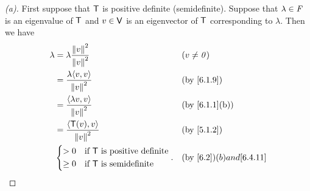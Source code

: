 \begin{proof}[(a)]
	First suppose that \(\mathsf{T}\) is positive definite (semidefinite).
	Suppose that \(\lambda \in \mathit{F}\) is an eigenvalue of \(\mathsf{T}\) and \(v \in \mathsf{V}\) is an eigenvector of \(\mathsf{T}\) corresponding to \(\lambda\).
	Then we have
	\begin{align*}
		\lambda & = \lambda \frac{\norm{v}^2}{\norm{v}^2}                &  & (v \neq \zv)  \\
		        & = \frac{\lambda \inn{v, v}}{\norm{v}^2}                &  & \by{6.1.9}    \\
		        & = \frac{\inn{\lambda v, v}}{\norm{v}^2}                &  & \by{6.1.1}[b] \\
		        & = \frac{\inn{\T(v), v}}{\norm{v}^2}                    &  & \by{5.1.2}    \\
		        & \begin{dcases}
			          > 0    & \text{if } \T \text{ is positive definite} \\
			          \geq 0 & \text{if } \T \text{ is semidefinite}
		          \end{dcases}. &  & \by{6.2}(b) and \cref{6.4.11}
	\end{align*}


\end{proof}
